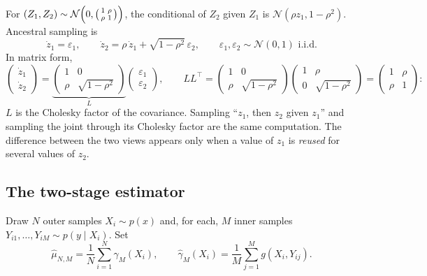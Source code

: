 \begin{notechapter}
\begin{example}\label{monte-carlo:ex:pair}
For $(Z_1,Z_2)\sim\mathcal N\Bigl(0,\begin{psmallmatrix}1&\rho\\\rho&1\end{psmallmatrix}\Bigr)$, the
conditional of $Z_2$ given $Z_1$ is $\mathcal N(\rho z_1, 1-\rho^2)$. Ancestral
sampling is
\[
  \dot z_1 = \varepsilon_1,\qquad \dot z_2 = \rho\,\dot z_1 + \sqrt{1-\rho^2}\,\varepsilon_2,
  \qquad \varepsilon_1,\varepsilon_2\sim\mathcal N(0,1)\text{ i.i.d.}
\]
In matrix form,
\[
  \begin{pmatrix}\dot z_1\\\dot z_2\end{pmatrix}
  = \underbrace{\begin{pmatrix}1&0\\\rho&\sqrt{1-\rho^2}\end{pmatrix}}_{L}
    \begin{pmatrix}\varepsilon_1\\\varepsilon_2\end{pmatrix},
  \qquad
  LL^\top = \begin{pmatrix}1&0\\\rho&\sqrt{1-\rho^2}\end{pmatrix}
            \begin{pmatrix}1&\rho\\0&\sqrt{1-\rho^2}\end{pmatrix}
          = \begin{pmatrix}1&\rho\\\rho&1\end{pmatrix}:
\]
$L$ is the Cholesky factor of the covariance. Sampling ``$z_1$, then $z_2$ given
$z_1$'' and sampling the joint through its Cholesky factor are the same
computation. The difference between the two views appears only when a value of
$z_1$ is \emph{reused} for several values of $z_2$.
\end{example}

\subsection{The two-stage estimator}

\begin{definition}
Draw $N$ outer samples $X_i\sim p(x)$ and, for each, $M$ inner samples
$Y_{i1},\dots,Y_{iM}\sim p(y\mid X_i)$. Set
\[
  \hat\mu_{N,M} = \frac1N\sum_{i=1}^N\hat\gamma_M(X_i),\qquad
  \hat\gamma_M(X_i) = \frac1M\sum_{j=1}^Mg(X_i,Y_{ij}).
\]
\end{definition}


\end{notechapter}
